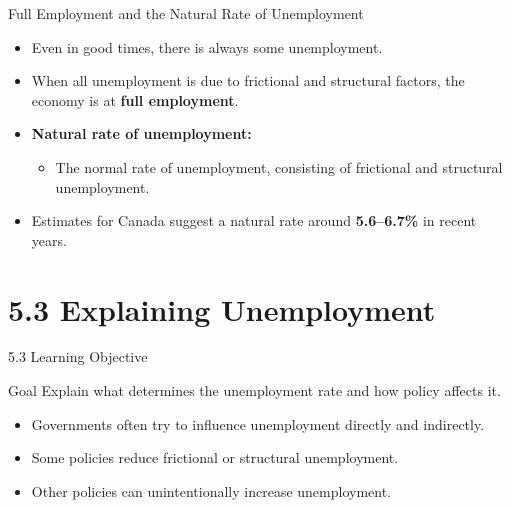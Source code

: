 \documentclass[aspectratio=169]{beamer}
\begin{document}
\begin{frame}{Full Employment and the Natural Rate of Unemployment}
\transfade
\begin{itemize}
  \item Even in good times, there is always some unemployment.
  \item When all unemployment is due to frictional and structural factors, the economy is at \textbf{full employment}.
  \item \textbf{Natural rate of unemployment:}
  \begin{itemize}
    \item The normal rate of unemployment, consisting of frictional and structural unemployment.
  \end{itemize}
  \item Estimates for Canada suggest a natural rate around \textbf{5.6--6.7\%} in recent years.
\end{itemize}
\end{frame}

\section{5.3 Explaining Unemployment}

\begin{frame}{5.3 Learning Objective}
\transfade
\begin{block}{Goal}
Explain what determines the unemployment rate and how policy affects it.
\end{block}
\begin{itemize}
  \item Governments often try to influence unemployment directly and indirectly.
  \item Some policies \alert{reduce} frictional or structural unemployment.
  \item Other policies can unintentionally \alert{increase} unemployment.
\end{itemize}
\end{frame}
\end{document}
